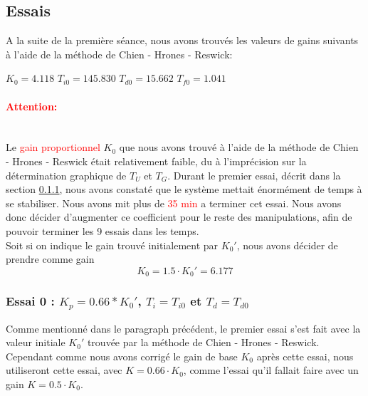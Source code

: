 \subsection{Essais}
A la suite de la première séance, nous avons trouvés les valeurs de gains suivants
à l'aide de la méthode de Chien - Hrones - Reswick:

\begin{center}
    $K_0  = 4.118$
    \hspace{1cm}
    $T_{i0} = 145.830$
    \hspace{1cm}
    $T_{d0} = 15.662$
    \hspace{1cm}
    $T_{f0} = 1.041$
\end{center}

\paragraph{\textcolor{red}{Attention:}}\mbox{}\\
Le \textcolor{red}{gain proportionnel} $K_0$ que nous avons trouvé à l'aide de la méthode de 
Chien - Hrones - Reswick était relativement faible, du à l'imprécision 
sur la détermination graphique de $T_{U}$ et $T_{G}$. Durant le premier essai,
décrit dans la section \ref{essai-0}, nous avons constaté que le système mettait
énormément de temps à se stabiliser. Nous avons mit plus de \textcolor{red}{35 min}
a terminer cet essai. Nous avons donc décider d'augmenter ce coefficient pour le
reste des manipulations, afin de pouvoir terminer les 9 essais dans les temps.\\

Soit si on indique le gain trouvé initialement par $K_0'$, nous avons décider de 
prendre comme gain $$K_0 = 1.5 \cdot K_0' = 6.177$$


\subsubsection{Essai 0 : $K_{p} = 0.66*K_{0}'$, $T_{i} = T_{i0}$ et $T_{d} = T_{d0}$} \label{essai-0}
Comme mentionné dans le paragraph précédent, le premier essai s'est fait avec
la valeur initiale $K_0'$ trouvée par la méthode de Chien - Hrones - Reswick.
Cependant comme nous avons corrigé le gain de base $K_0$ après cette essai, nous
utiliseront cette essai, avec $K = 0.66 \cdot K_0$, comme l'essai qu'il fallait
faire avec un gain $K = 0.5 \cdot K_0$.

